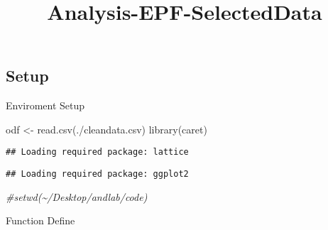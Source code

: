 \documentclass[
]{article}
\title{Analysis-EPF-SelectedData}
\author{}
\date{\vspace{-2.5em}}
\newenvironment{Shaded}{\begin{snugshade}}{\end{snugshade}}
\newcommand{\CommentTok}[1]{\textcolor[rgb]{0.56,0.35,0.01}{\textit{#1}}}
\newcommand{\FunctionTok}[1]{\textcolor[rgb]{0.00,0.00,0.00}{#1}}
\newcommand{\NormalTok}[1]{#1}
\newcommand{\OtherTok}[1]{\textcolor[rgb]{0.56,0.35,0.01}{#1}}
\newcommand{\StringTok}[1]{\textcolor[rgb]{0.31,0.60,0.02}{#1}}
\begin{document}
\maketitle

\hypertarget{setup}{%
\subsection{Setup}\label{setup}}

Enviroment Setup

\begin{Shaded}
\begin{Highlighting}[]
\NormalTok{odf }\OtherTok{\textless{}{-}} \FunctionTok{read.csv}\NormalTok{(}\StringTok{\textquotesingle{}./cleandata.csv\textquotesingle{}}\NormalTok{)}
\FunctionTok{library}\NormalTok{(}\StringTok{\textquotesingle{}caret\textquotesingle{}}\NormalTok{)}
\end{Highlighting}
\end{Shaded}

\begin{verbatim}
## Loading required package: lattice
\end{verbatim}

\begin{verbatim}
## Loading required package: ggplot2
\end{verbatim}

\begin{Shaded}
\begin{Highlighting}[]
\CommentTok{\#setwd(\textquotesingle{}\textasciitilde{}/Desktop/andlab/code\textquotesingle{})}
\end{Highlighting}
\end{Shaded}

Function Define
\end{document}
